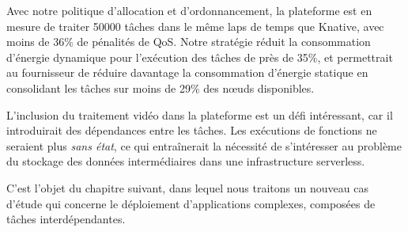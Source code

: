 Avec notre politique d'allocation et d'ordonnancement, la plateforme est en mesure de traiter \num{50000} tâches dans le même laps de temps que Knative, avec moins de 36\% de pénalités de \gls{QoS}. Notre stratégie réduit la consommation d'énergie dynamique pour l'exécution des tâches de près de 35\%, et permettrait au fournisseur de réduire davantage la consommation d'énergie statique en consolidant les tâches sur moins de 29\% des nœuds disponibles.

L'inclusion du traitement vidéo dans la plateforme est un défi intéressant, car il introduirait des dépendances entre les tâches. Les exécutions de fonctions ne seraient plus \textit{sans état}, ce qui entraînerait la nécessité de s'intéresser au problème du stockage des données intermédiaires dans une infrastructure serverless.

C'est l'objet du chapitre suivant, dans lequel nous traitons un nouveau cas d'étude qui concerne le déploiement d'applications complexes, composées de tâches interdépendantes.
